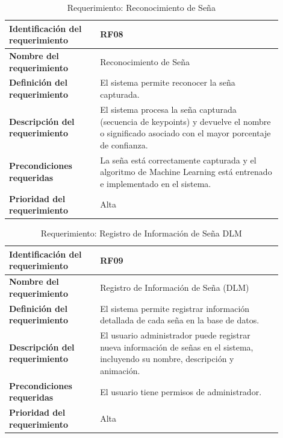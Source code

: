 \begin{table}[H]
    \centering
    \begin{tabular}{|p{0.3\linewidth}|p{0.6\linewidth}|}
        \hline
        \textbf{Identificación del requerimiento} & RF08 \\
        \hline
        \textbf{Nombre del requerimiento} & Reconocimiento de Seña \\
        \hline
        \textbf{Definición del requerimiento} & El sistema permite reconocer la seña capturada. \\
        \hline
        \textbf{Descripción del requerimiento} & El sistema procesa la seña capturada (secuencia de keypoints) y devuelve el nombre o significado asociado con el mayor porcentaje de confianza. \\
        \hline
        \textbf{Precondiciones requeridas} & La seña está correctamente capturada y el algoritmo de Machine Learning está entrenado e implementado en el sistema. \\
        \hline
        \textbf{Prioridad del requerimiento} & Alta \\
        \hline
    \end{tabular}
    \caption{Requerimiento: Reconocimiento de Seña}
    \label{tab:rf-reconocer}
\end{table}

\begin{table}[H]
    \centering
    \begin{tabular}{|p{0.3\linewidth}|p{0.6\linewidth}|}
        \hline
        \textbf{Identificación del requerimiento} & RF09 \\
        \hline
        \textbf{Nombre del requerimiento} & Registro de Información de Seña (DLM) \\
        \hline
        \textbf{Definición del requerimiento} & El sistema permite registrar información detallada de cada seña en la base de datos. \\
        \hline
        \textbf{Descripción del requerimiento} & El usuario administrador puede registrar nueva información de señas en el sistema, incluyendo su nombre, descripción y animación. \\
        \hline
        \textbf{Precondiciones requeridas} & El usuario tiene permisos de administrador. \\
        \hline
        \textbf{Prioridad del requerimiento} & Alta \\
        \hline
    \end{tabular}
    \caption{Requerimiento: Registro de Información de Seña DLM}
    \label{tab:rf-registra-informacion-dlm}
\end{table}

